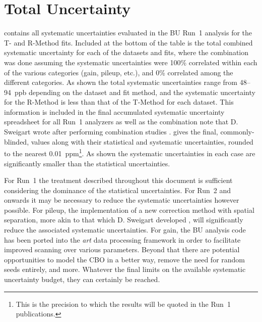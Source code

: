 \clearpage
\section{Total Uncertainty}


 contains all systematic uncertainties evaluated in the BU Run~1 \wa analysis for the T- and R-Method fits. Included at the bottom of the table is the total combined systematic uncertainty for each of the datasets and fits, where the combination was done assuming the systematic uncertainties were 100\% correlated within each of the various categories (gain, pileup, etc.), and 0\% correlated among the different categories. As shown the total systematic uncertainties range from 48--94~ppb depending on the dataset and fit method, and the systematic uncertainty for the R-Method is less than that of the T-Method for each dataset. This information is included in the final accumulated systematic uncertainty spreadsheet for all Run~1 analyzers \cite{UncertaintySpreadsheet} as well as the combination note that D. Sweigart wrote after performing combination studies \cite{CombinationNote}.  gives the final, commonly-blinded, \R values along with their statistical and systematic uncertainties, rounded to the nearest 0.01~ppm\footnote{This is the precision to which the results will be quoted in the Run~1 publications.}. As shown the systematic uncertainties in each case are significantly smaller than the statistical uncertainties.


For Run~1 the treatment described throughout this document is sufficient considering the dominance of the statistical uncertainties. For Run~2 and onwards it may be necessary to reduce the systematic uncertainties however possible. For pileup, the implementation of a new correction method with spatial separation, more akin to that which D. Sweigart developed \cite{phdthesis:2020Sweigart}, will significantly reduce the associated systematic uncertainties. For gain, the BU analysis code has been ported into the \textit{art} data processing framework in order to facilitate improved scanning over various parameters. Beyond that there are potential opportunities to model the CBO in a better way, remove the need for random seeds entirely, and more. Whatever the final limits on the available systematic uncertainty budget, they can certainly be reached.



